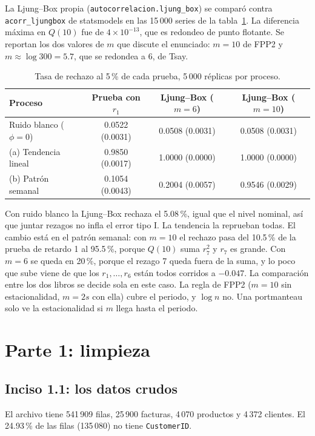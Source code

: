 \documentclass[11pt]{article}
\begin{document}
La Ljung--Box propia (\texttt{autocorrelacion.ljung\_box}) se comparó contra
\texttt{acorr\_ljungbox} de statsmodels en las 15\,000 series de la tabla~\ref{tab:ljung-box}. La
diferencia máxima en $Q(10)$ fue de $4\times10^{-13}$, que es redondeo de punto flotante. Se
reportan los dos valores de $m$ que discute el enunciado: $m=10$ de FPP2 y $m\approx\log 300=5.7$,
que se redondea a 6, de Tsay.

\begin{table}[H]
\centering
\caption{Tasa de rechazo al 5\,\% de cada prueba, 5\,000 réplicas por proceso.}\label{tab:ljung-box}
\begin{tabular}{|l|c|c|c|}
\hline
Proceso & Prueba con $r_1$ & Ljung--Box ($m=6$) & Ljung--Box ($m=10$) \\
\hline
Ruido blanco ($\phi=0$) & 0.0522 (0.0031) & 0.0508 (0.0031) & 0.0508 (0.0031) \\
(a) Tendencia lineal & 0.9850 (0.0017) & 1.0000 (0.0000) & 1.0000 (0.0000) \\
(b) Patrón semanal & 0.1054 (0.0043) & 0.2004 (0.0057) & 0.9546 (0.0029) \\
\hline
\end{tabular}
\end{table}

Con ruido blanco la Ljung--Box rechaza el 5.08\,\%, igual que el nivel nominal, así que juntar
rezagos no infla el error tipo I. La tendencia la reprueban todas. El cambio está en el patrón
semanal: con $m=10$ el rechazo pasa del 10.5\,\% de la prueba de retardo 1 al 95.5\,\%, porque
$Q(10)$ suma $r_7^2$ y $r_7$ es grande. Con $m=6$ se queda en 20\,\%, porque el rezago 7 queda
fuera de la suma, y lo poco que sube viene de que los $r_1,\dots,r_6$ están todos corridos a
$-0.047$. La comparación entre los dos libros se decide sola en este caso. La regla de FPP2
($m=10$ sin estacionalidad, $m=2s$ con ella) cubre el periodo, y $\log n$ no. Una portmanteau
solo ve la estacionalidad si $m$ llega hasta el periodo.

\section*{Parte 1: limpieza}

\subsection*{Inciso 1.1: los datos crudos}

El archivo tiene 541\,909 filas, 25\,900 facturas, 4\,070 productos y 4\,372 clientes. El 24.93\,\%
de las filas (135\,080) no tiene \texttt{CustomerID}.
\end{document}
